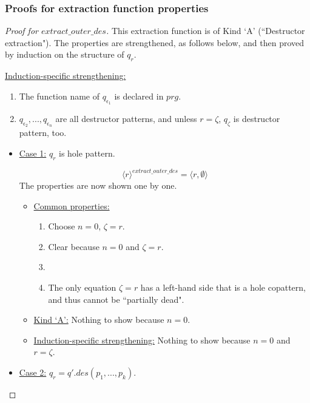 \documentclass[11pt]{article} %
\begin{document}
\subsubsection{Proofs for extraction function properties}

\begin{proof}[Proof for $extract\_outer\_des$]

This extraction function is of Kind `A' (``Destructor extraction"). The properties are strengthened, as follows below, and then proved by induction on the structure of $q_r$.

\underline{Induction-specific strengthening:}
\begin{enumerate}
\item The function name of $q_{\epsilon_1}$ is declared in $prg$.
\item $q_{\epsilon_2}, ..., q_{\epsilon_n}$ are all destructor patterns, and unless $r = \zeta$, $q_\zeta$ is destructor pattern, too.
\end{enumerate}

\begin{itemize}

\item \underline{Case 1:} $q_r$ is hole pattern.

\begin{equation*}
\langle r \rangle^{extract\_outer\_des} = \big\langle r, \emptyset \big\rangle
\end{equation*}
The properties are now shown one by one.
\begin{itemize}
\item \underline{Common properties:}
\begin{enumerate}
\item Choose $n = 0$, $\zeta = r$.
\item Clear because $n = 0$ and $\zeta = r$.
\item
\item The only equation $\zeta = r$ has a left-hand side that is a hole copattern, and thus cannot be ``partially dead".
\end{enumerate}

\item \underline{Kind `A':} Nothing to show because $n = 0$.

\item \underline{Induction-specific strengthening:} Nothing to show because $n = 0$ and $r = \zeta$.
\end{itemize}

\item \underline{Case 2:} $q_r = q'.des(p_1, ..., p_k)$.


\end{itemize}
\end{proof}
\end{document}

